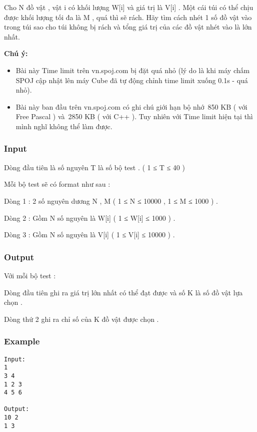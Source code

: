 

Cho N đồ vật , vật i có khối lượng W[i] và giá trị là V[i] . Một cái túi có thể chịu được khối lượng tối đa là M , quá thì sẽ rách. Hãy tìm cách nhét 1 số đồ vật vào trong túi sao cho túi không bị rách và tổng giá trị của các đồ vật nhét vào là lớn nhất.

\textbf{Chú ý:}
\begin{itemize}
	\item Bài này Time limit trên vn.spoj.com bị đặt quá nhỏ (lý do là khi máy chấm SPOJ cập nhật lên máy Cube đã tự động chỉnh time limit xuống 0.1s - quá nhỏ).
	\item Bài này ban đầu trên vn.spoj.com có ghi chú giới hạn bộ nhớ 850 KB ( với Free Pascal ) và 2850 KB ( với C++ ). Tuy nhiên với Time limit hiện tại thì mình nghĩ không thể làm được.
\end{itemize}

\subsubsection{Input}

Dòng đầu tiên là số nguyên T là số bộ test . ( 1 ≤ T ≤ 40 )


Mỗi bộ test sẽ có format như sau :


Dòng 1 : 2 số nguyên dương N , M ( 1 ≤ N ≤ 10000 , 1 ≤ M ≤ 1000 ) .


Dòng 2 : Gồm N số nguyên là W[i] ( 1 ≤ W[i] ≤ 1000 ) .


Dòng 3 : Gồm N số nguyên là V[i] ( 1 ≤ V[i] ≤ 10000 ) .

\subsubsection{Output}

Với mỗi bộ test :


Dòng đầu tiên ghi ra giá trị lớn nhất có thể đạt được và số K là số đồ vật lựa chọn .


Dòng thứ 2 ghi ra chỉ số của K đồ vật được chọn .

\subsubsection{Example}
\begin{verbatim}
Input:
1
3 4
1 2 3
4 5 6

Output:
10 2
1 3\end{verbatim}
